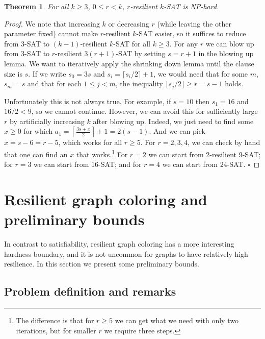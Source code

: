 \documentclass{llncs}
\newtheorem{thm}{Theorem}
\begin{document}
\begin{thm}

For all $k \geq 3$, $0 \leq r < k$, $r$-resilient $k$-SAT is NP-hard.

\end{thm}
\begin{proof}

We note that increasing $k$ or decreasing $r$ (while leaving the other
parameter fixed) cannot make $r$-resilient $k$-SAT easier, so it suffices to
reduce from 3-SAT to $(k-1)$-resilient $k$-SAT for all $k \geq 3$. For any $r$
we can blow up from 3-SAT to $r$-resilient $3(r+1)$-SAT by setting $s = r+1$ in
the blowing up lemma. We want to iteratively apply the shrinking down lemma
until the clause size is $s$. If we write $s_0 = 3s$ and $s_i = \lceil s_i/2
\rceil + 1$, we would need that for some $m$, $s_m = s$ and that for each $1
\leq j < m$, the inequality $\lfloor s_j / 2 \rfloor \geq r = s-1$ holds.

Unfortunately this is not always true. For example, if $s = 10$ then $s_1 =
16$ and $16/2 < 9$, so we cannot continue. However, we can avoid this for
sufficiently large $r$ by artificially increasing $k$ after blowing up. Indeed,
we just need to find some $x \geq 0$ for which
$
   a_1 = \left \lceil \frac{3s+x}{2} \right \rceil + 1 = 2(s-1).
$
And we can pick $x = s - 6 = r - 5$, which works for all $r \geq 5$. For $r =
2,3,4$, we can check by hand that one can find an $x$ that works.\footnote{The
difference is that for $r \geq 5$ we can get what we need with only two
iterations, but for smaller $r$ we require three steps.} For $r=2$ we can
start from 2-resilient 9-SAT; for $r=3$ we can start from 16-SAT; and for $r=4$
we can start from 24-SAT.
\hfill $\square$
\end{proof}

\section{Resilient graph coloring and preliminary bounds}
\label{sec:resilient-coloring-obs-bounds}

In contrast to satisfiability, resilient graph coloring has a more interesting
hardness boundary, and it is not uncommon for graphs to have relatively high
resilience. In this section we present some preliminary bounds.

\subsection{Problem definition and remarks}
\end{document}
